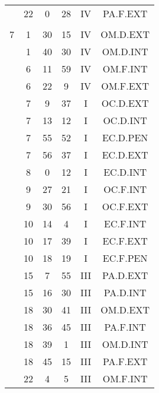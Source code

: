 \documentclass[12pt, a4paper]{article}
\begin{document}
\begin{multicols}{3}
{\begin{tabular}{c c c c c c}
	 	 	 	 & 22 & 0 & 28 & IV & PA.F.EXT\\%
	 	 	 	 & & & & & \\%
	 	 	 	7 & 1 & 30 & 15 & IV & OM.D.EXT\\%
	 	 	 	 & 1 & 40 & 30 & IV & OM.D.INT\\%
	 	 	 	 & 6 & 11 & 59 & IV & OM.F.INT\\%
	 	 	 	 & 6 & 22 & 9 & IV & OM.F.EXT\\%
	 	 	 	 & 7 & 9 & 37 & I & OC.D.EXT\\%
	 	 	 	 & 7 & 13 & 12 & I & OC.D.INT\\%
	 	 	 	 & 7 & 55 & 52 & I & EC.D.PEN\\%
	 	 	 	 & 7 & 56 & 37 & I & EC.D.EXT\\%
	 	 	 	 & 8 & 0 & 12 & I & EC.D.INT\\%
	 	 	 	 & 9 & 27 & 21 & I & OC.F.INT\\%
	 	 	 	 & 9 & 30 & 56 & I & OC.F.EXT\\%
	 	 	 	 & 10 & 14 & 4 & I & EC.F.INT\\%
	 	 	 	 & 10 & 17 & 39 & I & EC.F.EXT\\%
	 	 	 	 & 10 & 18 & 19 & I & EC.F.PEN\\%
	 	 	 	 & 15 & 7 & 55 & III & PA.D.EXT\\%
	 	 	 	 & 15 & 16 & 30 & III & PA.D.INT\\%
	 	 	 	 & 18 & 30 & 41 & III & OM.D.EXT\\%
	 	 	 	 & 18 & 36 & 45 & III & PA.F.INT\\%
	 	 	 	 & 18 & 39 & 1 & III & OM.D.INT\\%
	 	 	 	 & 18 & 45 & 15 & III & PA.F.EXT\\%
	 	 	 	 & 22 & 4 & 5 & III & OM.F.INT\\%

\end{tabular}}
\end{multicols}
\end{document}

